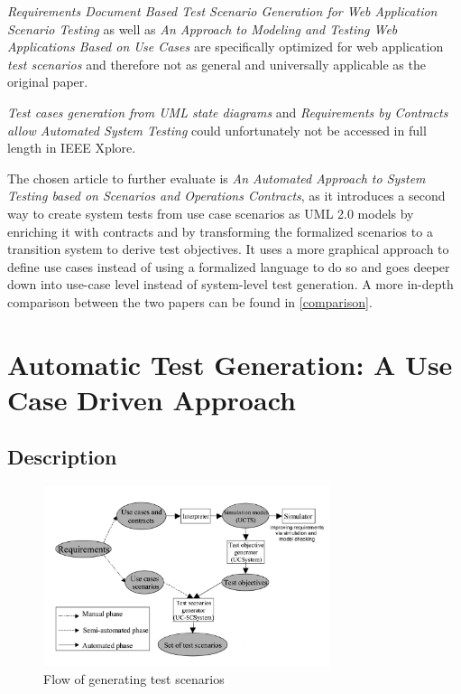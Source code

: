 \textit{Requirements Document Based Test Scenario Generation for Web Application Scenario Testing} as well as \textit{An Approach to Modeling and Testing Web Applications Based on Use Cases} are specifically optimized for web application \textit{test scenarios} and therefore not as general and universally applicable as the original paper.

\textit{Test cases generation from UML state diagrams} and \textit{Requirements by Contracts allow Automated System Testing} could unfortunately not be accessed in full length in IEEE Xplore.

The chosen article to further evaluate is \textit{An Automated Approach to System Testing based on Scenarios and Operations Contracts}, as it introduces a second way to create system tests from use case scenarios as UML 2.0 models by enriching it with contracts and by transforming the formalized scenarios to a transition system to derive test objectives. It uses a more graphical approach to define use cases instead of using a formalized language to do so and goes deeper down into use-case level instead of system-level test generation. A more in-depth comparison between the two papers can be found in \autoref{comparison}.

\section{Automatic Test Generation: A Use Case Driven Approach} \label{approachone}

\subsection{Description}

\begin{figure}[h]
	\centering
	\includegraphics[width=0.75\textwidth]{./images/transitionsystemflow.png}
	\caption{Flow of generating test scenarios \cite{ClementineNebut2006}}
	\label{tsf}
\end{figure}

